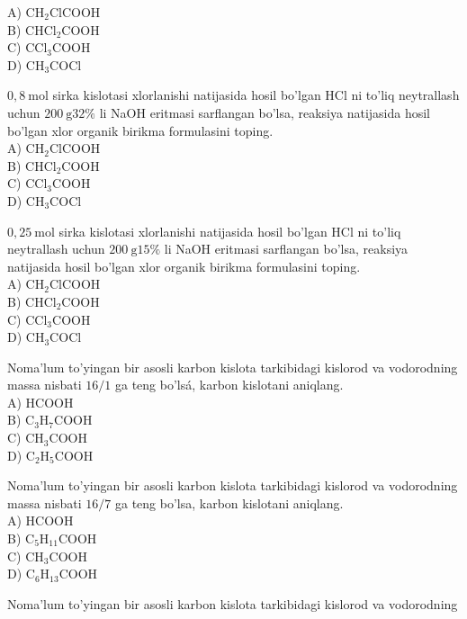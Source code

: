 A) $\mathrm{CH}_{2} \mathrm{ClCOOH}$\\
B) $\mathrm{CHCl}_{2} \mathrm{COOH}$\\
C) $\mathrm{CCl}_{3} \mathrm{COOH}$\\
D) $\mathrm{CH}_{3} \mathrm{COCl}$
  \item $0,8 \mathrm{~mol}$ sirka kislotasi xlorlanishi natijasida hosil bo'lgan HCl ni to'liq neytrallash uchun $200 \mathrm{~g} 32 \%$ li NaOH eritmasi sarflangan bo'lsa, reaksiya natijasida hosil bo'lgan xlor organik birikma formulasini toping.\\
A) $\mathrm{CH}_{2} \mathrm{ClCOOH}$\\
B) $\mathrm{CHCl}_{2} \mathrm{COOH}$\\
C) $\mathrm{CCl}_{3} \mathrm{COOH}$\\
D) $\mathrm{CH}_{3} \mathrm{COCl}$
  \item $0,25 \mathrm{~mol}$ sirka kislotasi xlorlanishi natijasida hosil bo'lgan HCl ni to'liq neytrallash uchun $200 \mathrm{~g} 15 \%$ li NaOH eritmasi sarflangan bo'lsa, reaksiya natijasida hosil bo'lgan xlor organik birikma formulasini toping.\\
A) $\mathrm{CH}_{2} \mathrm{ClCOOH}$\\
B) $\mathrm{CHCl}_{2} \mathrm{COOH}$\\
C) $\mathrm{CCl}_{3} \mathrm{COOH}$\\
D) $\mathrm{CH}_{3} \mathrm{COCl}$
  \item Noma'lum to'yingan bir asosli karbon kislota tarkibidagi kislorod va vodorodning massa nisbati $16 / 1$ ga teng bo'lsá, karbon kislotani aniqlang.\\
A) HCOOH\\
B) $\mathrm{C}_{3} \mathrm{H}_{7} \mathrm{COOH}$\\
C) $\mathrm{CH}_{3} \mathrm{COOH}$\\
D) $\mathrm{C}_{2} \mathrm{H}_{5} \mathrm{COOH}$\\
  \item Noma'lum to'yingan bir asosli karbon kislota tarkibidagi kislorod va vodorodning massa nisbati $16 / 7$ ga teng bo'lsa, karbon kislotani aniqlang.\\
A) HCOOH\\
B) $\mathrm{C}_{5} \mathrm{H}_{11} \mathrm{COOH}$\\
C) $\mathrm{CH}_{3} \mathrm{COOH}$\\
D) $\mathrm{C}_{6} \mathrm{H}_{13} \mathrm{COOH}$
  \item Noma'lum to'yingan bir asosli karbon kislota tarkibidagi kislorod va vodorodning\\
